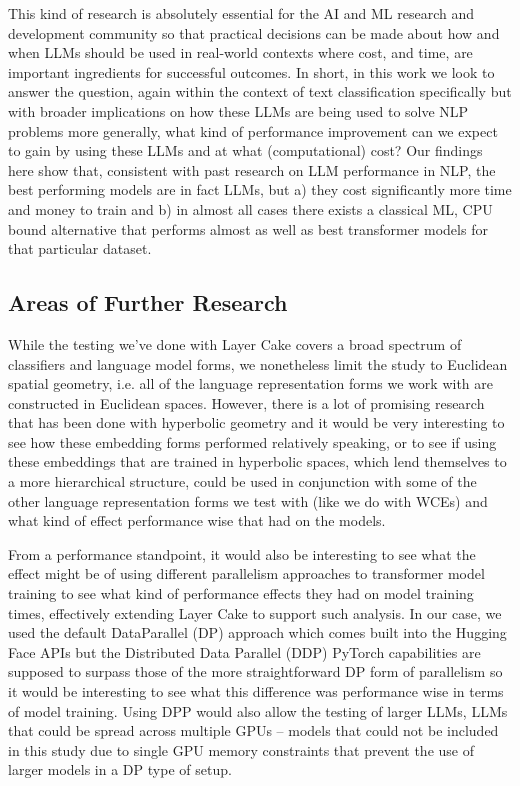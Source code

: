 \documentclass[final]{clv2025}
\begin{document}
This kind of research is absolutely essential for the AI and ML research and development community so that practical decisions can be made about how and when LLMs should be used in real-world contexts where cost, and time, are important ingredients for successful outcomes. In short, in this work we look to answer the question, again within the context of text classification specifically but with broader implications on how these LLMs are being used to solve NLP problems more generally, what kind of performance improvement can we expect to gain by using these LLMs and at what (computational) cost? Our findings here show that, consistent with past research on LLM performance in NLP, the best performing models are in fact LLMs, but a) they cost significantly more time and money to train and b) in almost all cases there exists a classical ML, CPU bound alternative that performs almost as well as best transformer models for that particular dataset. 


\subsection{Areas of Further Research }

While the testing we’ve done with Layer Cake covers a broad spectrum of classifiers and language model forms, we nonetheless limit the study to Euclidean spatial geometry, i.e. all of the language representation forms we work with are constructed in Euclidean spaces. However, there is a lot of promising research that has been done with hyperbolic geometry \cite{tifrea} \cite{leimeister2019skip} \cite{valentino} and it would be very interesting to see how these embedding forms performed relatively speaking, or to see if using these embeddings that are trained in hyperbolic spaces, which lend themselves to a more hierarchical structure, could be used in conjunction with some of the other language representation forms we test with (like we do with WCEs) and what kind of effect performance wise that had on the models.

From a performance standpoint, it would also be interesting to see what the effect might be of using different parallelism approaches to transformer model training to see what kind of performance effects they had on model training times, effectively extending Layer Cake to support such analysis. In our case, we used the default DataParallel (DP) approach which comes built into the Hugging Face APIs but the Distributed Data Parallel (DDP) PyTorch capabilities are supposed to surpass those of the more straightforward DP form of parallelism so it would be interesting to see what this difference was performance wise in terms of model training. Using DPP would also allow the testing of larger LLMs, LLMs that could be spread across multiple GPUs – models that could not be included in this study due to single GPU memory constraints that prevent the use of larger models in a DP type of setup. 
\end{document}

